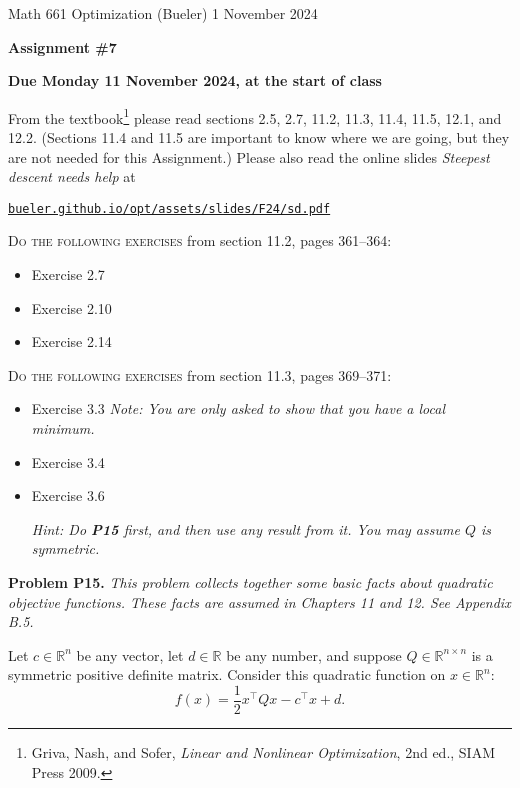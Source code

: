 \documentclass[12pt]{amsart}
\newcommand{\RR}{\mathbb{R}}
\newcommand{\prob}[1]{\bigskip\noindent\textbf{#1}\quad }
\begin{document}
\scriptsize \noindent Math 661 Optimization (Bueler) \hfill 1 November 2024
\normalsize

\medskip\bigskip

\Large\centerline{\textbf{Assignment \#7}}
\large
\bigskip

\centerline{\textbf{Due Monday 11 November 2024, at the start of class}}
\bigskip
\normalsize

\thispagestyle{empty}

\bigskip
\noindent From the textbook\footnote{Griva, Nash, and Sofer, \emph{Linear and Nonlinear Optimization}, 2nd ed., SIAM Press 2009.} please read sections 2.5, 2.7, 11.2, 11.3, 11.4, 11.5, 12.1, and 12.2.  (Sections 11.4 and 11.5 are important to know where we are going, but they are not needed for this Assignment.)  Please also read the online slides \emph{Steepest descent needs help} at

  \centerline{\href{https://bueler.github.io/opt/assets/slides/F24/sd.pdf}{\texttt{bueler.github.io/opt/assets/slides/F24/sd.pdf}}}

\bigskip
\noindent \textsc{Do the following exercises} from section 11.2, pages 361--364:

\begin{itemize}
\item Exercise 2.7
\item Exercise 2.10
\item Exercise 2.14
\end{itemize}

\bigskip
\noindent \textsc{Do the following exercises} from section 11.3, pages 369--371:

\begin{itemize}
\item Exercise 3.3 \quad \emph{Note: You are only asked to show that you have a \emph{local} minimum.}
\item Exercise 3.4
\item Exercise 3.6 \quad \begin{minipage}[t]{0.7\textwidth} \emph{Hint: Do \emph{\textbf{P15}} first, and then use any result from it.  You may assume $Q$ is symmetric.}\end{minipage}
\end{itemize}


\prob{Problem P15.}  \emph{This problem collects together some basic facts about quadratic objective functions.  These facts are assumed in Chapters 11 and 12.  See Appendix B.5.}

\medskip \noindent Let $c\in\RR^n$ be any vector, let $d\in\RR$ be any number, and suppose $Q\in \RR^{n\times n}$ is a symmetric positive definite matrix.  Consider this quadratic function on $x\in\RR^n$:
\begin{equation*}
    f(x) = \frac{1}{2} x^\top Q x - c^\top x + d.   \label{quad}
\end{equation*}
\end{document}
